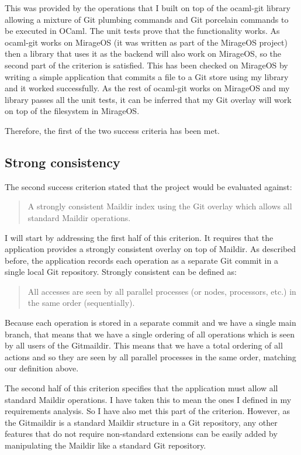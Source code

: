 This was provided by the operations that I built on top of the ocaml-git library allowing a mixture of Git plumbing commands and Git porcelain commands to be executed in OCaml. The unit tests prove that the functionality works. As ocaml-git works on MirageOS (it was written as part of the MirageOS project) then a library that uses it as the backend will also work on MirageOS, so the second part of the criterion is satisfied. This has been checked on MirageOS by writing a simple application that commits a file to a Git store using my library and it worked successfully. As the rest of ocaml-git works on MirageOS and my library passes all the unit tests, it can be inferred that my Git overlay will work on top of the filesystem in MirageOS.

Therefore, the first of the two success criteria has been met.

\subsection{Strong consistency}

The second success criterion stated that the project would be evaluated against:

\begin{quote}
  A strongly consistent Maildir index using the Git overlay which allows all standard Maildir operations.
\end{quote}

I will start by addressing the first half of this criterion. It requires that the application provides a strongly consistent overlay on top of Maildir. As described before, the application records each operation as a separate Git commit in a single local Git repository. Strongly consistent can be defined as:
\begin{quote}
  All accesses are seen by all parallel processes (or nodes, processors, etc.) in the same order (sequentially).
\end{quote}
Because each operation is stored in a separate commit and we have a single main branch, that means that we have a single ordering of all operations which is seen by all users of the Gitmaildir. This means that we have a total ordering of all actions and so they are seen by all parallel processes in the same order, matching our definition above.

The second half of this criterion specifies that the application must allow all standard Maildir operations. I have taken this to mean the ones I defined in my requirements analysis. So I have also met this part of the criterion. However, as the Gitmaildir is a standard Maildir structure in a Git repository, any other features that do not require non-standard extensions can be easily added by manipulating the Maildir like a standard Git repository.

